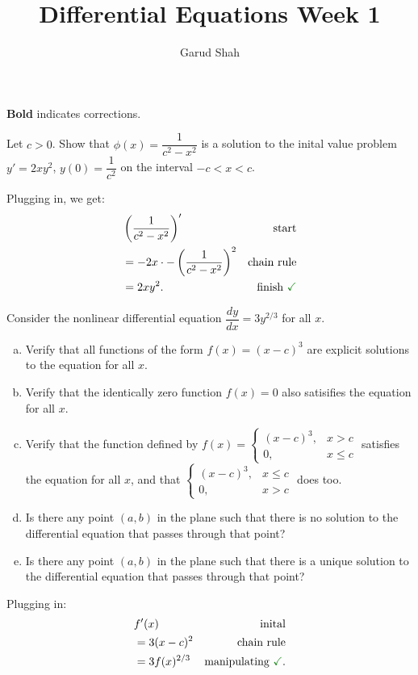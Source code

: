\documentclass{article}
\title{Differential Equations Week 1}
\author{Garud Shah}
\begin{document}
\maketitle
\newpage
\textbf{Bold} indicates corrections.
\begin{problem}
    Let $c>0$. Show that $\phi(x) = \dfrac{1}{c^2-x^2}$ is a solution to the inital value problem
    $y' = 2xy^2$, $y(0) = \dfrac{1}{c^2}$ on the interval $-c < x < c$.
\end{problem}
\begin{solution*}
    Plugging in, we get:
    \begin{align*}
        & \left(\dfrac{1}{c^2-x^2}\right)' & \text{start}\\ 
        &= -2x \cdot -\left(\dfrac{1}{c^2-x^2}\right)^2 & \text{chain rule}\\ 
        &= 2xy^2. & \text{finish \done}
    \end{align*}
\end{solution*}
\begin{problem}
    Consider the nonlinear differential equation $\dfrac{dy}{dx}=3y^{2/3}$ for all $x$.
    \begin{enumerate}[(a)]
    \item Verify that all functions of the form $f(x)={(x-c)}^3$ are explicit solutions to the equation for all $x$. 
    \item Verify that the identically zero function $f(x)=0$ also satisifies the equation for all $x$.
    \item Verify that the function defined by 
    $f(x) = \begin{cases}
    {(x-c)}^3, & x>c \\ 
    0, &x \le c\end{cases}$ satisfies the equation for all $x$, and that $\begin{cases}
    {(x-c)}^3, & x\le c \\ 
    0, &x > c\end{cases}$ does too.
    \item Is there any point $(a,b)$
    in the plane such that there is no solution to the differential equation that passes through that point?
    \item Is there any point $(a,b)$
    in the plane such that there is a unique solution to the differential equation that passes through that point?
    \end{enumerate}
\end{problem}
\hfill \break
\begin{solution}[Problem 2a]
    Plugging in:
    \begin{align*}
        &f'(x)   & \text{inital}\\ 
        &= 3(x-c)^2 & \text{chain rule} \\ 
        &= 3f(x)^{2/3} & \text{manipulating \done}.
    \end{align*}
\end{solution}
\end{document}
